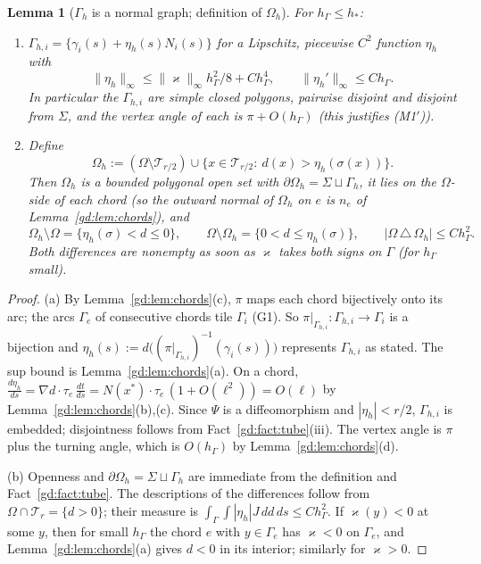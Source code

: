 \documentclass[11pt,reqno]{amsart}
\theoremstyle{plain}
\newtheorem{lemma}[theorem]{Lemma}
\theoremstyle{definition}
\newcommand{\hG}{h_\Gamma}
\newcommand{\Gh}{\Gamma_h}
\newcommand{\Oh}{\Omega_h}
\newcommand{\norm}[1]{\lVert #1\rVert}
\newcommand{\kap}{\varkappa}            %
\newcommand{\kapi}{\norm{\kap}_\infty}
\begin{document}
\begin{lemma}[$\Gh$ is a normal graph; definition of $\Oh$]\label{gd:lem:graph}
For $\hG\le h_\ast$:
\begin{enumerate}[label=(\alph*)]
\item $\Gamma_{h,i}=\{\gamma_i(s)+\eta_h(s)N_i(s)\}$ for a Lipschitz, piecewise $C^2$ function $\eta_h$ with
\[
\norm{\eta_h}_\infty\le\kapi\hG^2/8+C\hG^4,\qquad\norm{\eta_h'}_\infty\le C\hG .
\]
In particular the $\Gamma_{h,i}$ are simple closed polygons, pairwise disjoint and disjoint from $\Sigma$, and the vertex angle of each is $\pi+O(\hG)$ (this justifies (M1$'$)).
\item Define
\[
\Oh:=(\Omega\setminus\mathcal T_{r/2})\cup\{x\in\mathcal T_{r/2}:\ d(x)>\eta_h(\sigma(x))\}.
\]
Then $\Oh$ is a bounded polygonal open set with $\partial\Oh=\Sigma\sqcup\Gh$, it lies on the $\Omega$-side of each chord (so the outward normal of $\Oh$ on $e$ is $n_e$ of Lemma~\ref{gd:lem:chords}), and
\[
\Oh\setminus\Omega=\{\eta_h(\sigma)<d\le0\},\qquad\Omega\setminus\Oh=\{0<d\le\eta_h(\sigma)\},\qquad|\Omega\,\triangle\,\Oh|\le C\hG^2 .
\]
Both differences are nonempty as soon as $\kap$ takes both signs on $\Gamma$ (for $\hG$ small).
\end{enumerate}
\end{lemma}

\begin{proof}
(a) By Lemma~\ref{gd:lem:chords}(c), $\pi$ maps each chord bijectively onto its arc; the arcs $\Gamma_e$ of consecutive chords tile $\Gamma_i$ (G1). So $\pi|_{\Gamma_{h,i}}:\Gamma_{h,i}\to\Gamma_i$ is a bijection and $\eta_h(s):=d\bigl((\pi|_{\Gamma_{h,i}})^{-1}(\gamma_i(s))\bigr)$ represents $\Gamma_{h,i}$ as stated. The sup bound is Lemma~\ref{gd:lem:chords}(a). On a chord, $\frac{d\eta_h}{ds}=\nabla d\cdot\tau_e\,\frac{dt}{ds}=N(x^\ast)\cdot\tau_e\,(1+O(\ell^2))=O(\ell)$ by Lemma~\ref{gd:lem:chords}(b),(c). Since $\Psi$ is a diffeomorphism and $|\eta_h|<r/2$, $\Gamma_{h,i}$ is embedded; disjointness follows from Fact~\ref{gd:fact:tube}(iii). The vertex angle is $\pi$ plus the turning angle, which is $O(\hG)$ by Lemma~\ref{gd:lem:chords}(d).

(b) Openness and $\partial\Oh=\Sigma\sqcup\Gh$ are immediate from the definition and Fact~\ref{gd:fact:tube}. The descriptions of the differences follow from $\Omega\cap\mathcal T_r=\{d>0\}$; their measure is $\int_\Gamma\int|\eta_h|J\,dd\,ds\le C\hG^2$. If $\kap(y)<0$ at some $y$, then for small $\hG$ the chord $e$ with $y\in\Gamma_e$ has $\kap<0$ on $\Gamma_e$, and Lemma~\ref{gd:lem:chords}(a) gives $d<0$ in its interior; similarly for $\kap>0$.
\end{proof}
\end{document}

